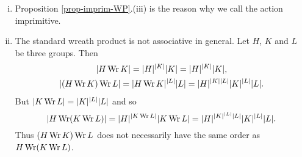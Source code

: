 \begin{remark}\begin{enumerate}[(i)]
		\item 	Proposition \ref{prop-imprim-WP}.(iii) is the reason why we call the action imprimitive.
		\item The standard wreath product is not associative in general. Let $H$, $K$ and $L$ be three groups. Then
\begin{gather*}
	|H \operatorname{Wr} K| = |H|^{|K|} |K| = |H|^{|K|} |K|,
	\\
	|(H \operatorname{Wr} K) \operatorname{Wr} L| = |H \operatorname{Wr} K|^{|L|} |L| = |H|^{|K||L|} |K|^{|L|} |L|.
\end{gather*}  But $|K \operatorname{Wr} L| = |K|^{|L|} |L|$ and so $$|H \operatorname{Wr} (K \operatorname{Wr} L)| = |H|^{|K \operatorname{Wr} L|} |K \operatorname{Wr} L| = |H|^{|K|^{|L|} |L|} |K|^{|L|} |L|.$$
 Thus $(H \operatorname{Wr} K) \operatorname{Wr} L$ does not necessarily have the same order  as $H \operatorname{Wr} (K \operatorname{Wr} L)$. 
	\end{enumerate}

\end{remark}

